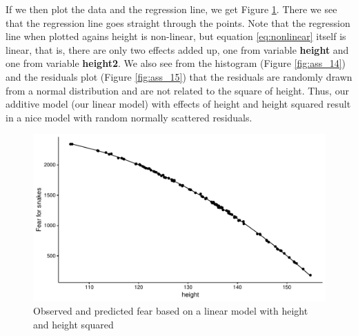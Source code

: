 \documentclass[]{book}\usepackage[]{graphicx}\usepackage[]{color}
\makeatletter
\def\maxwidth{ %
  \ifdim\Gin@nat@width>\linewidth
    \linewidth
  \else
    \Gin@nat@width
  \fi
}
\newenvironment{knitrout}{}{} %
\makeatother
\begin{document}
If we then plot the data and the regression line, we get Figure \ref{fig:ass_13}. There we see that the regression line goes straight through the points. Note that the regression line when plotted agains height is non-linear, but equation \ref{eq:nonlinear} itself is linear, that is, there are only two effects added up, one from variable \textbf{height} and one from variable \textbf{height2}. We also see from the histogram (Figure \ref{fig:ass_14}) and the residuals plot (Figure \ref{fig:ass_15}) that the residuals are randomly drawn from a normal distribution and are not related to the square of height. Thus, our additive model (our linear model) with effects of height and height squared result in a nice model with random normally scattered residuals. 

\begin{knitrout}
\color{fgcolor}\begin{figure}

{\centering \includegraphics[width=\maxwidth]{figure/ass_13-1} 

}

\caption[Observed and predicted fear based on a linear model with height and height squared]{Observed and predicted fear based on a linear model with height and height squared}\label{fig:ass_13}
\end{figure}


\end{knitrout}
\end{document}

